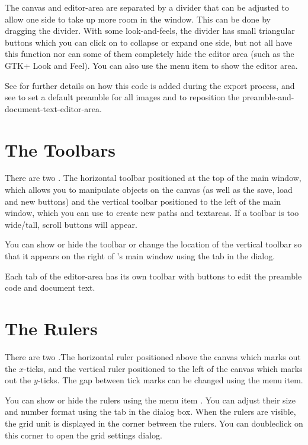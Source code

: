 The \gls{canvas} and \gls{editor-area} are separated by a divider that can be adjusted to
allow one side to take up more room in the window. This can be done
by dragging the divider.  With some \glspl{look-and-feel}, the
divider has small triangular buttons which you can click on to
collapse or expand one side, but not all have this function nor can
some of them completely hide the editor area (such as the GTK+
Look and Feel).  You can also use the  menu
item to show the editor area.

See  for further details on how this
code is added during the export process, and
see  to set a default preamble
for all images and to reposition the \gls{preamble-and-document-text-editor-area}.

\section{The Toolbars}\label{sec:thetoolbars}

There are two .  The horizontal toolbar positioned at
the top of the main window, which allows you to manipulate
\glspl{object} on the \gls{canvas} (as well as the save, load and
new buttons) and the vertical toolbar positioned to the left of the
main window, which you can use to create new \glspl{path} and
\glspl{textarea}. If a toolbar is too wide\slash tall, scroll buttons will
appear.

You can show or hide the \gls{toolbar} or change the location of
the vertical toolbar so that it appears on the right of \FlowframTk's
main window using the  tab in the
 dialog.

Each tab of the \gls{editor-area} has its own
toolbar with buttons to edit the preamble code and document text.


\section{The Rulers}\label{sec:therulers}

There are two .The horizontal ruler
positioned above the \gls{canvas} which marks out the $x$-ticks, and
the vertical ruler positioned to the left of the \gls*{canvas} which
marks out the $y$-ticks. The gap between tick marks can be changed
using the  menu item.

You can show or hide the \glspl*{ruler} using the menu item
.  You can adjust their size and number format
using the  tab in the 
dialog box. When the rulers are visible, the grid unit is displayed
in the corner between the rulers. You can \gls{doubleclick} on this
corner to open the grid settings dialog.

